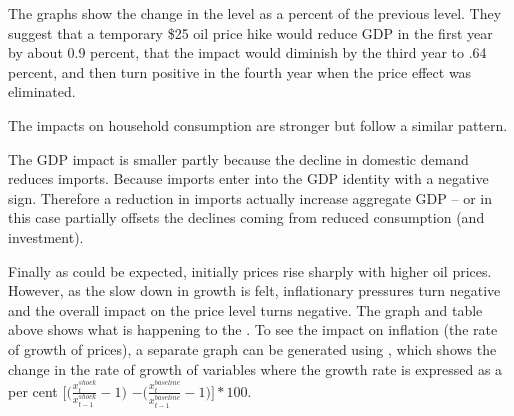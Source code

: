 \documentclass[letterpaper,10pt,english]{jupyterBook}
\begin{document}
\sphinxAtStartPar
The graphs show the change in the level as a percent of the previous level. They suggest that a temporary \$25 oil price hike would reduce GDP in the first year by about 0.9 percent, that the impact would diminish by the third year to \sphinxhyphen{}.64 percent, and then turn positive in the fourth year when the price effect was eliminated.

\sphinxAtStartPar
The impacts on household consumption are stronger but follow a similar pattern.

\sphinxAtStartPar
The GDP impact is smaller partly because the decline in domestic demand reduces imports.  Because imports enter into the GDP identity with a negative sign. Therefore a reduction in imports actually increase aggregate GDP – or in this case partially offsets the declines coming from reduced consumption (and investment).

\sphinxAtStartPar
Finally as could be expected, initially prices rise sharply with higher oil prices. However, as the slow down in growth is felt, inflationary pressures turn negative and the overall impact on the price level turns negative.  The graph and table above shows what is happening to the . To see the impact on inflation (the rate of growth of prices), a separate graph can be generated using , which shows the change in the rate of growth of variables where the growth rate is expressed as a per cent \(\bigg[\bigg(\frac{x^{shock}_t}{x^{shock}_{t-1}}-1\bigg)\) \( - \bigg(\frac{x^{baseline}_t}{x^{baseline}_{t-1}}-1\bigg)\Bigg]*100\).
\end{document}

